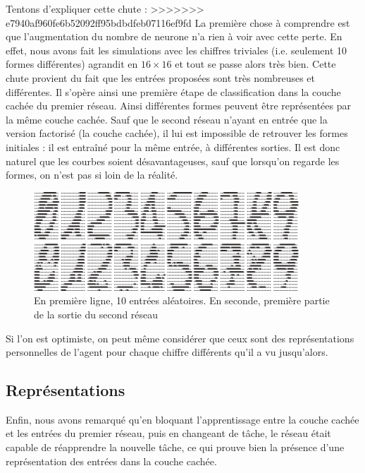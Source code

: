 \documentclass[a4paper,12pt, twoside]{article}
\begin{document}
Tentons d'expliquer cette chute :
>>>>>>> e7940af960fe6b52092ff95bdbdfeb07116ef9fd
\newline La première chose à comprendre est que l'augmentation
du nombre de neurone n'a rien à voir avec cette perte. En effet, nous avons fait les 
simulations avec les chiffres triviales (i.e. seulement 10 formes différentes) agrandit en $16 \times 16$
et tout se passe alors très bien.
\newline
Cette chute provient du fait que les entrées proposées sont très nombreuses et différentes. Il s'opère ainsi
une première étape de classification dans la couche cachée du premier réseau.
Ainsi différentes formes peuvent être représentées par la même couche cachée.
Sauf que le second réseau n'ayant en entrée que la version factorisé (la couche cachée), il lui 
est impossible de retrouver les formes initiales : il est entraîné pour la même entrée, à différentes 
sorties.
Il est donc naturel que les courbes soient désavantageuses, sauf que lorsqu'on regarde les formes, 
on n'est pas si loin de la réalité.

\begin{figure}[H]
\begin{center}
 \includegraphics[height=140px]{metarepre.png}
\end{center}
\caption{ En première ligne, 10 entrées aléatoires. En seconde, première partie de la sortie du second réseau}
\end{figure}

Si l'on est optimiste, on peut même considérer que ceux sont des représentations personnelles de 
l'agent pour chaque chiffre différents qu'il a vu jusqu'alors.


\subsection{Représentations}

Enfin, nous avons remarqué qu'en bloquant l'apprentissage entre la couche cachée et les 
entrées du premier réseau, puis en changeant de tâche, le réseau était capable de réapprendre
la nouvelle tâche, ce qui prouve bien la présence d'une représentation des entrées dans la couche 
cachée.
\end{document}
